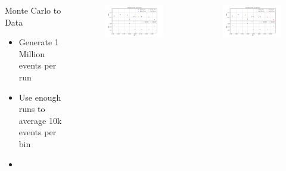 \documentclass{beamer}
\begin{document}
\begin{frame}
	\begin{columns}
		\begin{block}{Monte Carlo to Data}
		\begin{itemize}
			\item Generate 1 Million events per run
			\item Use enough runs to average 10k events per bin
			\item 
		\end{itemize}
		\end{block}
		\vspace{-20pt}
		\begin{figure}
			\includegraphics[width=7.5cm]{../images/D2_kin1}
		\end{figure}
		\vspace{-40pt}
		\begin{figure}
			\includegraphics[width=7.5cm]{../images/D2_kin1}
		\end{figure}
	\end{columns}

\end{frame}

\begin{frame}


\end{frame}
\end{document}
